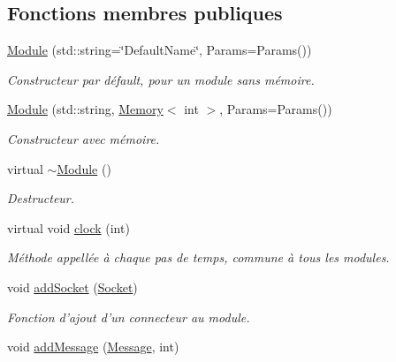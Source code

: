 \subsection*{Fonctions membres publiques}
\begin{DoxyCompactItemize}
\item 
\hypertarget{classModule_a3412148164f0668b2ae4cd1285c2790c}{\hyperlink{classModule_a3412148164f0668b2ae4cd1285c2790c}{Module} (std\-::string=\char`\"{}Default\-Name\char`\"{}, Params=Params())}\label{classModule_a3412148164f0668b2ae4cd1285c2790c}

\begin{DoxyCompactList}\small\item\em Constructeur par défault, pour un module sans mémoire. \end{DoxyCompactList}\item 
\hypertarget{classModule_ae2ce24f11deec1453dfaba1f21a36f2c}{\hyperlink{classModule_ae2ce24f11deec1453dfaba1f21a36f2c}{Module} (std\-::string, \hyperlink{classMemory}{Memory}$<$ int $>$, Params=Params())}\label{classModule_ae2ce24f11deec1453dfaba1f21a36f2c}

\begin{DoxyCompactList}\small\item\em Constructeur avec mémoire. \end{DoxyCompactList}\item 
\hypertarget{classModule_a7c9d9c096786d127590fdd8aa2b7d681}{virtual \hyperlink{classModule_a7c9d9c096786d127590fdd8aa2b7d681}{$\sim$\-Module} ()}\label{classModule_a7c9d9c096786d127590fdd8aa2b7d681}

\begin{DoxyCompactList}\small\item\em Destructeur. \end{DoxyCompactList}\item 
virtual void \hyperlink{classModule_ab7ea9648fa500696c85e93ebd0666390}{clock} (int)
\begin{DoxyCompactList}\small\item\em Méthode appellée à chaque pas de temps, commune à tous les modules. \end{DoxyCompactList}\item 
\hypertarget{classModule_aeb7302c667eb923a4dc25ae235c744dc}{void \hyperlink{classModule_aeb7302c667eb923a4dc25ae235c744dc}{add\-Socket} (\hyperlink{classSocket}{Socket})}\label{classModule_aeb7302c667eb923a4dc25ae235c744dc}

\begin{DoxyCompactList}\small\item\em Fonction d'ajout d'un connecteur au module. \end{DoxyCompactList}\item 
\hypertarget{classModule_a7adde67e02dd73bbea1441f7833edc4b}{void \hyperlink{classModule_a7adde67e02dd73bbea1441f7833edc4b}{add\-Message} (\hyperlink{classMessage}{Message}, int)}\label{classModule_a7adde67e02dd73bbea1441f7833edc4b}


\end{DoxyCompactItemize}
